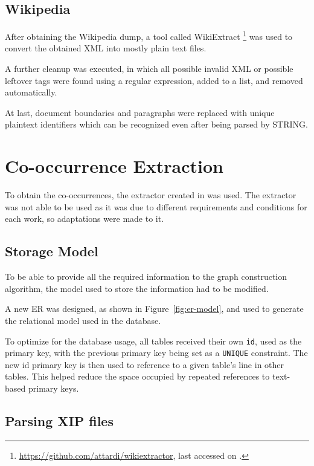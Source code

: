 \subsection{Wikipedia}

After obtaining the Wikipedia dump, a tool called WikiExtract
\footnote{\url{https://github.com/attardi/wikiextractor}, last accessed on
.} was used to convert the obtained XML into mostly plain
text files.

A further cleanup was executed, in which all possible invalid \ac{XML} or
possible leftover tags were found using a regular expression, added to a list,
and removed automatically.

At last, document boundaries and paragraphs were replaced with unique
plaintext identifiers which can be recognized even after being parsed by
\ac{STRING}.

\section{Co-occurrence Extraction}

To obtain the co-occurrences, the extractor created in \cite{correia2015syntax}
was used. The extractor was not able to be used as it was due to different
requirements and conditions for each work, so adaptations were made to it.

\subsection{Storage Model}

To be able to provide all the required information to the graph construction
algorithm, the model used to store the information had to be modified.

A new \ac{ER} was designed, as shown in Figure~\ref{fig:er-model}, and used to
generate the relational model used in the database.

To optimize for the database usage, all tables received their own \texttt{id},
used as the primary key, with the previous primary key being set as a
\texttt{UNIQUE} constraint. The new id primary key is then used to reference to
a given table's line in other tables. This helped reduce the space occupied by
repeated references to text-based primary keys.

\subsection{Parsing XIP files}

